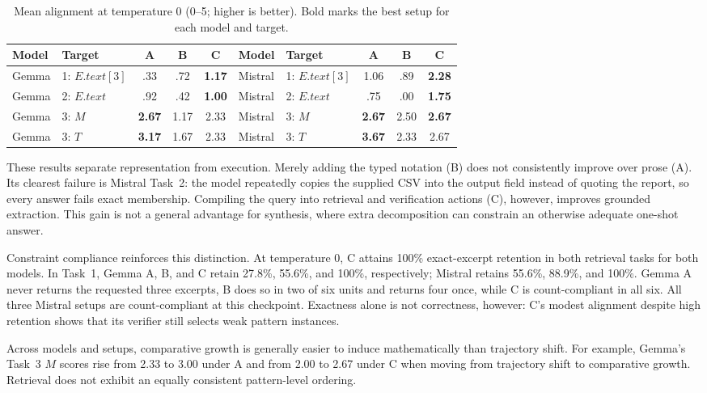 \documentclass[sigconf,nonacm,anonymous]{acmart}
\begin{document}
\begin{table}[t]
\centering
\small
\setlength{\tabcolsep}{4pt}
\caption{Mean alignment at temperature 0 (0--5; higher is better). Bold marks the best setup for each model and target.}
\label{tab:primary-results}
\begin{tabular}{llccc@{\hspace{10pt}}llccc}
\toprule
\textbf{Model} & \textbf{Target} & \textbf{A} & \textbf{B} & \textbf{C} &
\textbf{Model} & \textbf{Target} & \textbf{A} & \textbf{B} & \textbf{C} \\
\midrule
Gemma & 1: $E.text[3]$ & .33 & .72 & \textbf{1.17} &
Mistral & 1: $E.text[3]$ & 1.06 & .89 & \textbf{2.28} \\
Gemma & 2: $E.text$ & .92 & .42 & \textbf{1.00} &
Mistral & 2: $E.text$ & .75 & .00 & \textbf{1.75} \\
Gemma & 3: $M$ & \textbf{2.67} & 1.17 & 2.33 &
Mistral & 3: $M$ & \textbf{2.67} & 2.50 & \textbf{2.67} \\
Gemma & 3: $T$ & \textbf{3.17} & 1.67 & 2.33 &
Mistral & 3: $T$ & \textbf{3.67} & 2.33 & 2.67 \\
\bottomrule
\end{tabular}
\end{table}

These results separate representation from execution. Merely adding the typed notation (B) does not consistently improve over prose (A). Its clearest failure is Mistral Task~2: the model repeatedly copies the supplied CSV into the output field instead of quoting the report, so every answer fails exact membership. Compiling the query into retrieval and verification actions (C), however, improves grounded extraction. This gain is not a general advantage for synthesis, where extra decomposition can constrain an otherwise adequate one-shot answer.

Constraint compliance reinforces this distinction. At temperature 0, C attains 100\% exact-excerpt retention in both retrieval tasks for both models. In Task~1, Gemma A, B, and C retain 27.8\%, 55.6\%, and 100\%, respectively; Mistral retains 55.6\%, 88.9\%, and 100\%. Gemma A never returns the requested three excerpts, B does so in two of six units and returns four once, while C is count-compliant in all six. All three Mistral setups are count-compliant at this checkpoint. Exactness alone is not correctness, however: C's modest alignment despite high retention shows that its verifier still selects weak pattern instances.

Across models and setups, comparative growth is generally easier to induce mathematically than trajectory shift. For example, Gemma's Task~3 $M$ scores rise from 2.33 to 3.00 under A and from 2.00 to 2.67 under C when moving from trajectory shift to comparative growth. Retrieval does not exhibit an equally consistent pattern-level ordering.
\end{document}
